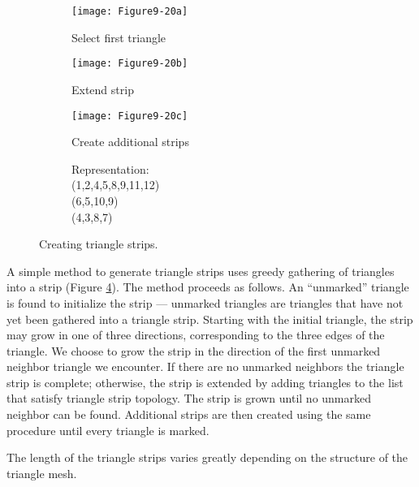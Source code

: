 \begin{figure}[htb]
	\begin{subfigure}[h]{0.48\linewidth}
		\texttt{[image: Figure9-20a]}
		\captionsetup{justification=centering}
		\caption*{Select first triangle}
		\label{fig:Figure9-20a}
	\end{subfigure}
	\hfill
	\begin{subfigure}[h]{0.48\linewidth}
		\texttt{[image: Figure9-20b]}
		\captionsetup{justification=centering}
		\caption*{Extend strip}
		\label{fig:Figure9-20b}
	\end{subfigure}
	\begin{subfigure}[h]{0.48\linewidth}
		\texttt{[image: Figure9-20c]}
		\captionsetup{justification=centering}
		\caption*{Create additional strips}
		\label{fig:Figure9-20c}
	\end{subfigure}
	\hfill
	\begin{subfigure}[h]{0.48\linewidth}
    \centering
        \begin{minipage}[b]{.4\textwidth}
        \centering
        Representation:\\
        (1,2,4,5,8,9,11,12)\\
        (6,5,10,9)\\
        (4,3,8,7)
        \end{minipage}
		\captionsetup{justification=centering}
		\caption*{}
	\end{subfigure}
	\caption{Creating triangle strips.}\label{fig:Figure9-20}
\end{figure}


A simple method to generate triangle strips uses greedy gathering of triangles into a strip (Figure \ref{fig:Figure9-20}). The method proceeds as follows. An ``unmarked'' triangle is found to initialize the strip --- unmarked triangles are triangles that have not yet been gathered into a triangle strip. Starting with the initial triangle, the strip may grow in one of three directions, corresponding to the three edges of the triangle. We choose to grow the strip in the direction of the first unmarked neighbor triangle we encounter. If there are no unmarked neighbors the triangle strip is complete; otherwise, the strip is extended by adding triangles to the list that satisfy triangle strip topology. The strip is grown until no unmarked neighbor can be found. Additional strips are then created using the same procedure until every triangle is marked.

The length of the triangle strips varies greatly depending on the structure of the triangle mesh.

